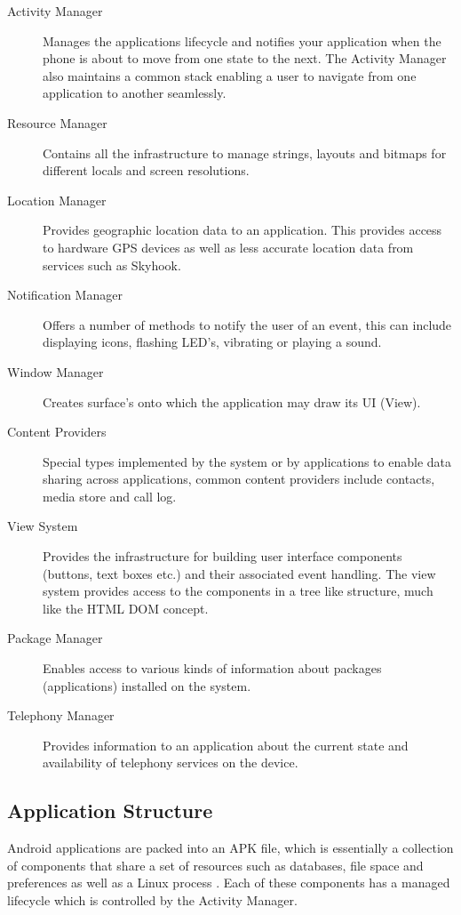 \begin{description}
\item[Activity Manager] Manages the applications lifecycle and notifies your application when the phone is about to move from one state to the next. The Activity Manager also maintains a common stack enabling a user to navigate from one application to another seamlessly.
\item[Resource Manager] Contains all the infrastructure to manage strings, layouts and bitmaps for different locals and screen resolutions.
\item[Location Manager] Provides geographic location data to an application. This provides access to hardware GPS devices as well as less accurate location data from services such as Skyhook.
\item[Notification Manager] Offers a number of methods to notify the user of an event, this can include displaying icons, flashing LED’s, vibrating or playing a sound.
\item[Window Manager] Creates surface’s onto which the application may draw its UI (View).
\item[Content Providers] Special types implemented by the system or by applications to enable data sharing across applications, common content providers include contacts, media store and call log.
\item[View System] Provides the infrastructure for building user interface components (buttons, text boxes etc.) and their associated event handling. The view system provides access to the components in a tree like structure, much like the HTML DOM concept.
\item[Package Manager] Enables access to various kinds of information about packages (applications) installed on the system.
\item[Telephony Manager] Provides information to an application about the current state and availability of telephony services on the device. 
\end{description}


\subsection{Application Structure}

Android applications are packed into an APK file, which is essentially a collection of components that share a set of resources such as databases, file space and preferences as well as a Linux process \cite{googioappframework08}. Each of these components has a managed lifecycle which is controlled by the Activity Manager.

